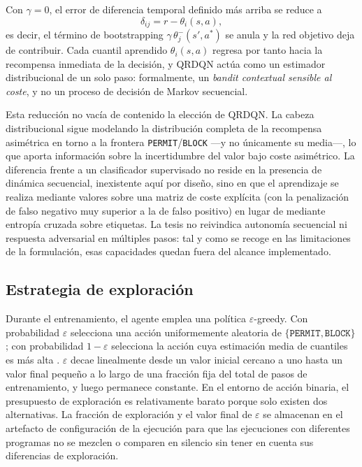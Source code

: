 Con $\gamma = 0$, el error de diferencia temporal definido más arriba se reduce a
\[
    \delta_{ij} = r - \theta_i(s, a),
\]
es decir, el término de bootstrapping $\gamma\,\theta_j^-(s', a^*)$ se anula y la red objetivo deja de contribuir. Cada cuantil aprendido $\theta_i(s,a)$ regresa por tanto hacia la recompensa inmediata de la decisión, y QRDQN actúa como un estimador distribucional de un solo paso: formalmente, un \emph{bandit contextual sensible al coste}, y no un proceso de decisión de Markov secuencial.

Esta reducción no vacía de contenido la elección de QRDQN. La cabeza distribucional sigue modelando la distribución completa de la recompensa asimétrica en torno a la frontera \texttt{PERMIT}/\texttt{BLOCK} —y no únicamente su media—, lo que aporta información sobre la incertidumbre del valor bajo coste asimétrico. La diferencia frente a un clasificador supervisado no reside en la presencia de dinámica secuencial, inexistente aquí por diseño, sino en que el aprendizaje se realiza mediante valores sobre una matriz de coste explícita (con la penalización de falso negativo muy superior a la de falso positivo) en lugar de mediante entropía cruzada sobre etiquetas. La tesis no reivindica autonomía secuencial ni respuesta adversarial en múltiples pasos: tal y como se recoge en las limitaciones de la formulación, esas capacidades quedan fuera del alcance implementado.

\subsection{Estrategia de exploración}
Durante el entrenamiento, el agente emplea una política $\varepsilon$-greedy. Con probabilidad $\varepsilon$ selecciona una acción uniformemente aleatoria de $\{\texttt{PERMIT}, \texttt{BLOCK}\}$; con probabilidad $1-\varepsilon$ selecciona la acción cuya estimación media de cuantiles es más alta \parencite{Mnih2015DQN}. $\varepsilon$ decae linealmente desde un valor inicial cercano a uno hasta un valor final pequeño a lo largo de una fracción fija del total de pasos de entrenamiento, y luego permanece constante. En el entorno de acción binaria, el presupuesto de exploración es relativamente barato porque solo existen dos alternativas. La fracción de exploración y el valor final de $\varepsilon$ se almacenan en el artefacto de configuración de la ejecución para que las ejecuciones con diferentes programas no se mezclen o comparen en silencio sin tener en cuenta sus diferencias de exploración.

